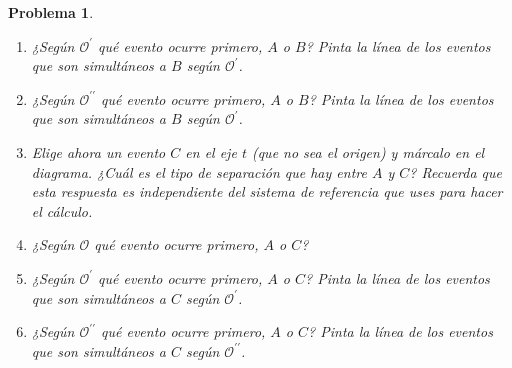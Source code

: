 \documentclass[12pt]{article}
\theoremstyle{break}
\newtheorem{exercise}{Problema}
\theoremstyle{nonumberbreak}
\newcommand*{\observer}{\mathcal{O}}
\newcommand*{\primeobserver}{\mathcal{O}^{\prime}}
\newcommand*{\biprimeobserver}{\mathcal{O}^{\prime\prime}}
\begin{document}
\begin{exercise}
\begin{enumerate}[label = \alph*)]
            \item ¿Según \(\primeobserver\) qué evento ocurre primero, \(A\) o \(B\)? Pinta la línea de los eventos que son simultáneos a \(B\) según \(\primeobserver\).
            \item ¿Según \(\biprimeobserver\) qué evento ocurre primero, \(A\) o \(B\)? Pinta la línea de los eventos que son simultáneos a \(B\) según \(\primeobserver\).
            \item Elige ahora un evento \(C\) en el eje \(t\) (que no sea el origen) y márcalo en el diagrama. ¿Cuál es el tipo de separación que hay entre \(A\) y \(C\)? Recuerda que esta respuesta es independiente del sistema de referencia que uses para hacer el cálculo.
            \item ¿Según \(\observer\) qué evento ocurre primero, \(A\) o \(C\)?
            \item ¿Según \(\primeobserver\) qué evento ocurre primero, \(A\) o \(C\)? Pinta la línea de los eventos que son simultáneos a \(C\) según \(\primeobserver\).
            \item ¿Según \(\biprimeobserver\) qué evento ocurre primero, \(A\) o \(C\)? Pinta la línea de los eventos que son simultáneos a \(C\) según \(\biprimeobserver\).
        \end{enumerate}
    \end{exercise}
\end{document}
